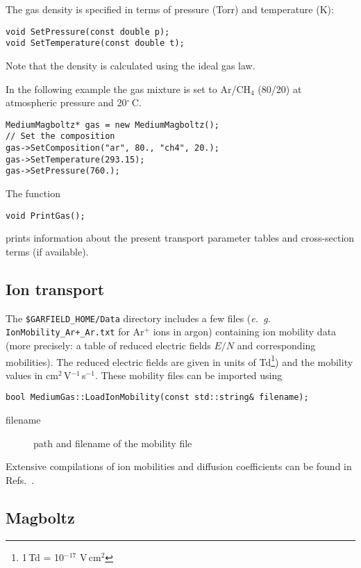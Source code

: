 The gas density is specified in terms of pressure (Torr) 
and temperature (K):
\begin{lstlisting}
void SetPressure(const double p);
void SetTemperature(const double t);
\end{lstlisting}
Note that the density is calculated using the ideal gas law. 

In the following example the gas mixture is set 
to Ar/CH\(_{4}\) (80/20) at 
atmospheric pressure and 20\(^{\circ}\)\,C.
\begin{lstlisting}
MediumMagboltz* gas = new MediumMagboltz();
// Set the composition
gas->SetComposition("ar", 80., "ch4", 20.);
gas->SetTemperature(293.15);
gas->SetPressure(760.);
\end{lstlisting}

The function
\begin{lstlisting}
void PrintGas();
\end{lstlisting}
prints information about the present transport parameter tables and 
cross-section terms (if available). 

\subsection{Ion transport}

The \texttt{\$GARFIELD\_HOME/Data} directory includes a few files 
(\textit{e.~g.} \texttt{IonMobility\_Ar+\_Ar.txt} for Ar\(^{+}\) ions in argon) 
containing ion mobility data (more precisely: a table of 
reduced electric fields \(E/N\) and corresponding mobilities).
The reduced electric fields are given in units of   
Td\footnote{1\,Td = 10\(^{-17}\) V\,cm\(^{2}\)}) and the mobility values 
in cm\(^{2}\)\,V\(^{-1}\)\,s\(^{-1}\). 
These mobility files can be imported using
\begin{lstlisting}
bool MediumGas::LoadIonMobility(const std::string& filename);
\end{lstlisting}
\begin{description}
  \item[filename] path and filename of the mobility file
\end{description}
Extensive compilations of ion mobilities and diffusion coefficients 
can be found in Refs.~\cite{Ellis1976,Ellis1978,Ellis1984,Viehland1995}. 

\subsection{Magboltz}

